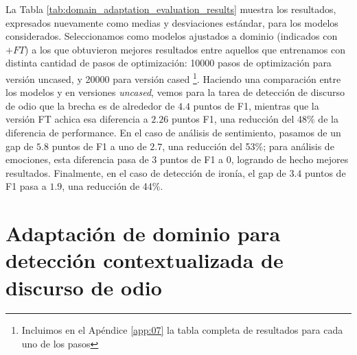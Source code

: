 La Tabla \ref{tab:domain_adaptation_evaluation_results} muestra los resultados, expresados nuevamente como medias y desviaciones estándar, para los modelos considerados. Seleccionamos como modelos ajustados a dominio (indicados con $+FT$) a los que obtuvieron mejores resultados entre aquellos que entrenamos con distinta cantidad de pasos de optimización: \num{10000} pasos de optimización para \beto{} versión uncased, y \num{20000} para versión cased \footnote{Incluimos en el Apéndice \ref{app:07} la tabla completa de resultados para cada uno de los pasos}. Haciendo una comparación entre los modelos \beto{} y \robertuito{} en versiones \emph{uncased}, vemos para la tarea de detección de discurso de odio que la brecha es de alrededor de $4.4$ puntos de F1, mientras que la versión FT achica esa diferencia a $2.26$ puntos F1, una reducción del 48\% de la diferencia de performance. En el caso de análisis de sentimiento, pasamos de un gap de $5.8$ puntos de F1 a uno de $2.7$, una reducción del 53\%; para análisis de emociones, esta diferencia pasa de $3$ puntos de F1 a $0$, logrando de hecho mejores resultados. Finalmente, en el caso de detección de ironía, el gap de $3.4$ puntos de F1 pasa a $1.9$, una reducción de 44\%.

\section{Adaptación de dominio para detección contextualizada de discurso de odio}

